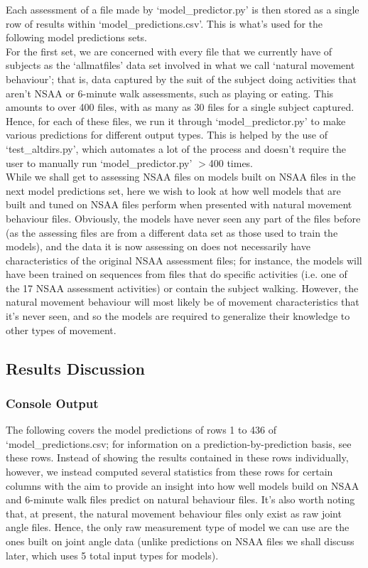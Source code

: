 \documentclass[12pt,twoside]{report}
\begin{document}
\quad Each assessment of a file made by ‘model\_predictor.py’ is then stored as a single row of results within ‘model\_predictions.csv’. This is what’s used for the following model predictions sets.\\

\quad For the first set, we are concerned with every file that we currently have of subjects as the ‘allmatfiles’ data set involved in what we call ‘natural movement behaviour’; that is, data captured by the suit of the subject doing activities that aren’t NSAA or 6-minute walk assessments, such as playing or eating. This amounts to over 400 files, with as many as 30 files for a single subject captured. Hence, for each of these files, we run it through ‘model\_predictor.py’ to make various predictions for different output types. This is helped by the use of ‘test\_altdirs.py’, which automates a lot of the process and doesn’t require the user to manually run ‘model\_predictor.py’ $>$400 times.\\

\quad While we shall get to assessing NSAA files on models built on NSAA files in the next model predictions set, here we wish to look at how well models that are built and tuned on NSAA files perform when presented with natural movement behaviour files. Obviously, the models have never seen any part of the files before (as the assessing files are from a different data set as those used to train the models), and the data it is now assessing on does not necessarily have characteristics of the original NSAA assessment files; for instance, the models will have been trained on sequences from files that do specific activities (i.e. one of the 17 NSAA assessment activities) or contain the subject walking. However, the natural movement behaviour will most likely be of movement characteristics that it’s never seen, and so the models are required to generalize their knowledge to other types of movement.


\subsection{Results Discussion}

\subsubsection{Console Output}

\quad The following covers the model predictions of rows 1 to 436 of ‘model\_predictions.csv; for information on a prediction-by-prediction basis, see these rows. Instead of showing the results contained in these rows individually, however, we instead computed several statistics from these rows for certain columns with the aim to provide an insight into how well models build on NSAA and 6-minute walk files predict on natural behaviour files. It’s also worth noting that, at present, the natural movement behaviour files only exist as raw joint angle files. Hence, the only raw measurement type of model we can use are the ones built on joint angle data (unlike predictions on NSAA files we shall discuss later, which uses 5 total input types for models).\\
\end{document}

